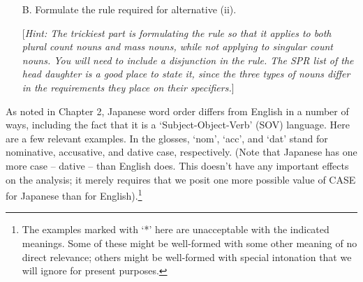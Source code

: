 \documentclass[a4paper,landscape,headrule,footrule]{foils}
\begin{document}
\begin{itemize}
%

\item[B.]  Formulate the rule required for alternative (ii).  \smallskip

\noindent
{[{\sl Hint:  The trickiest part is formulating the rule so that it
applies to both plural count nouns and mass nouns, while not applying
to singular count nouns.  You will need to include a disjunction in 
the rule.  The 
SPR list of the head daughter is a good place to state
it, since the three types of nouns differ in the requirements they
place on their specifiers.}]}

\end{itemize}


As noted 
in Chapter 2, Japanese word order differs from English in a number of ways,
including the fact that it is a  `Subject-Object-Verb' (SOV) language.  Here
are a few relevant examples. In the glosses, `{\sc nom}', `{\sc acc}', and 
`{\sc dat}' stand for  nominative,
 accusative, and  dative 
case, respectively.  (Note that Japanese has one more case -- dative -- than
English does.  This doesn't have any important effects on the analysis; it
merely requires that we posit one more possible value of CASE for Japanese
than for English).\footnote{The examples
marked with `*' here
are unacceptable with the indicated meanings.  Some of these might be
well-formed with some other meaning of no direct relevance; others might be
well-formed with special  intonation that we will ignore for present
purposes.}
\end{document}
